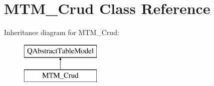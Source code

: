 \hypertarget{class_m_t_m___crud}{}\section{M\+T\+M\+\_\+\+Crud Class Reference}
\label{class_m_t_m___crud}
Inheritance diagram for M\+T\+M\+\_\+\+Crud\+:\begin{figure}[H]
\begin{center}
\leavevmode
\includegraphics[height=2.000000cm]{class_m_t_m___crud}
\end{center}
\end{figure}
